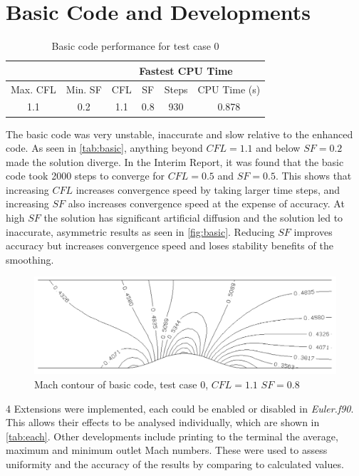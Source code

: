 \documentclass[12pt, a4paper]{article}
\begin{document}
\section{Basic Code and Developments}
\begin{table}[h]
	\centering
	\caption{Basic code performance for test case 0}
	\label{tab:basic}
	\begin{tabular}{|c|c||c|c|c|c|}
		\hline
		& & \multicolumn{4}{c|}{Fastest CPU Time} \\ \hline
		Max. CFL & Min. SF & CFL & SF & Steps & CPU Time (s) \\ \hline
		1.1 & 0.2 & 1.1 & 0.8 & 930 & 0.878 \\ \hline
	\end{tabular}
\end{table}
The basic code was very unstable, inaccurate and slow relative to the enhanced code. As seen in \autoref{tab:basic}, anything beyond $CFL=1.1$ and below $SF=0.2$ made the solution diverge. In the Interim Report, it was found that the basic code took 2000 steps to converge for $CFL=0.5$ and $SF=0.5$. This shows that increasing $CFL$ increases convergence speed by taking larger time steps, and increasing $SF$ also increases convergence speed at the expense of accuracy. At high $SF$ the solution has significant artificial diffusion and the solution led to inaccurate, asymmetric results as seen in \autoref{fig:basic}. Reducing $SF$ improves accuracy but increases convergence speed and loses stability benefits of the smoothing.
\begin{figure}[H]
	\centering
	\includegraphics[width=\textwidth]{plots/0 basic best}
	\caption{Mach contour of basic code, test case 0, $CFL=1.1$ $SF=0.8$}
	\label{fig:basic}
\end{figure}

4 Extensions were implemented, each could be enabled or disabled in \textit{Euler.f90}. This allows their effects to be analysed individually, which are shown in \autoref{tab:each}. Other developments include printing to the terminal the average, maximum and minimum outlet Mach numbers. These were used to assess uniformity and the accuracy of the results by comparing to calculated values.
\end{document}
